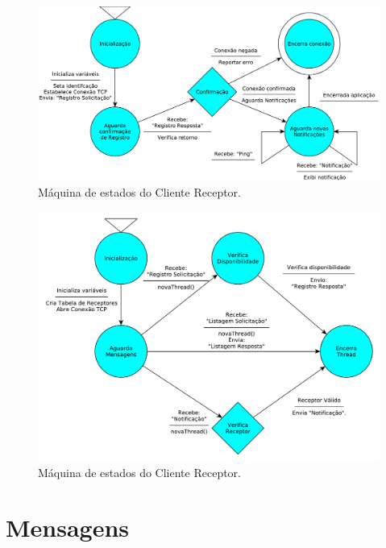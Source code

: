 \documentclass[12pt]{article}
\begin{document}
\begin{figure}%
	\centering
	\includegraphics[width=1\textwidth]{images/Protocolo_Cliente_Receptor.pdf}
	\caption{Máquina de estados do Cliente Receptor.}
	\label{fig:Receptor}
\end{figure}

\begin{figure}%
	\centering
	\includegraphics[width=1\textwidth]{images/Protocolo_Servidor.pdf}
	\caption{Máquina de estados do Cliente Receptor.}
	\label{fig:Servidor}
\end{figure}

\section{Mensagens}\label{sec:Mensagens}
\end{document}
